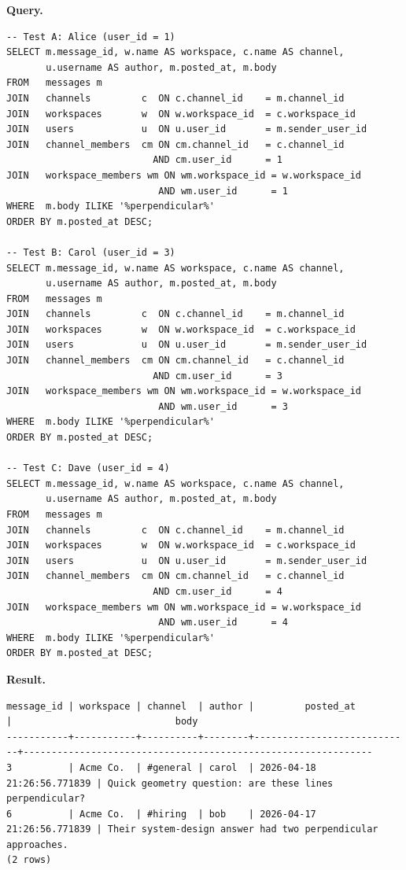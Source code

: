 \documentclass[11pt,letterpaper]{article}
\begin{document}
\noindent\textbf{Query.}
\begin{lstlisting}
-- Test A: Alice (user_id = 1)
SELECT m.message_id, w.name AS workspace, c.name AS channel,
       u.username AS author, m.posted_at, m.body
FROM   messages m
JOIN   channels         c  ON c.channel_id    = m.channel_id
JOIN   workspaces       w  ON w.workspace_id  = c.workspace_id
JOIN   users            u  ON u.user_id       = m.sender_user_id
JOIN   channel_members  cm ON cm.channel_id   = c.channel_id
                          AND cm.user_id      = 1
JOIN   workspace_members wm ON wm.workspace_id = w.workspace_id
                           AND wm.user_id      = 1
WHERE  m.body ILIKE '%perpendicular%'
ORDER BY m.posted_at DESC;

-- Test B: Carol (user_id = 3)
SELECT m.message_id, w.name AS workspace, c.name AS channel,
       u.username AS author, m.posted_at, m.body
FROM   messages m
JOIN   channels         c  ON c.channel_id    = m.channel_id
JOIN   workspaces       w  ON w.workspace_id  = c.workspace_id
JOIN   users            u  ON u.user_id       = m.sender_user_id
JOIN   channel_members  cm ON cm.channel_id   = c.channel_id
                          AND cm.user_id      = 3
JOIN   workspace_members wm ON wm.workspace_id = w.workspace_id
                           AND wm.user_id      = 3
WHERE  m.body ILIKE '%perpendicular%'
ORDER BY m.posted_at DESC;

-- Test C: Dave (user_id = 4)
SELECT m.message_id, w.name AS workspace, c.name AS channel,
       u.username AS author, m.posted_at, m.body
FROM   messages m
JOIN   channels         c  ON c.channel_id    = m.channel_id
JOIN   workspaces       w  ON w.workspace_id  = c.workspace_id
JOIN   users            u  ON u.user_id       = m.sender_user_id
JOIN   channel_members  cm ON cm.channel_id   = c.channel_id
                          AND cm.user_id      = 4
JOIN   workspace_members wm ON wm.workspace_id = w.workspace_id
                           AND wm.user_id      = 4
WHERE  m.body ILIKE '%perpendicular%'
ORDER BY m.posted_at DESC;
\end{lstlisting}

\noindent\textbf{Result.}

\begin{lstlisting}[style=result]
message_id | workspace | channel  | author |         posted_at          |                             body
-----------+-----------+----------+--------+----------------------------+--------------------------------------------------------------
3          | Acme Co.  | #general | carol  | 2026-04-18 21:26:56.771839 | Quick geometry question: are these lines perpendicular?
6          | Acme Co.  | #hiring  | bob    | 2026-04-17 21:26:56.771839 | Their system-design answer had two perpendicular approaches.
(2 rows)
\end{lstlisting}
\end{document}
